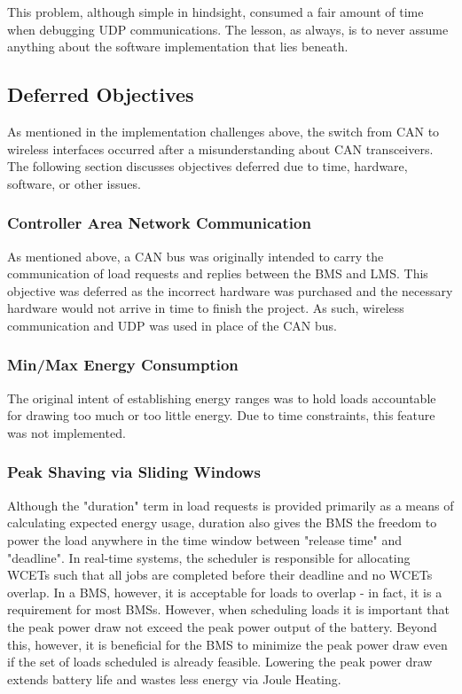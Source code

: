 \documentclass[11pt,conference,draftcls,onecolumn]{IEEEtran}
\begin{document}
This problem, although simple in hindsight, consumed a fair amount of time when debugging UDP communications.
The lesson, as always, is to never assume anything about the software implementation that lies beneath.

\subsection{Deferred Objectives}
As mentioned in the implementation challenges above, the switch from CAN to wireless interfaces occurred after a misunderstanding about CAN transceivers.
The following section discusses objectives deferred due to time, hardware, software, or other issues.

\subsubsection{Controller Area Network Communication}
As mentioned above, a CAN bus was originally intended to carry the communication of load requests and replies between the BMS and LMS.
This objective was deferred as the incorrect hardware was purchased and the necessary hardware would not arrive in time to finish the project.
As such, wireless communication and UDP was used in place of the CAN bus.

\subsubsection{Min/Max Energy Consumption}
The original intent of establishing energy ranges was to hold loads accountable for drawing too much or too little energy.
Due to time constraints, this feature was not implemented.

\subsubsection{Peak Shaving via Sliding Windows}
Although the "duration" term in load requests is provided primarily as a means of calculating expected energy usage, duration also gives the BMS the freedom to power the load anywhere in the time window between "release time" and "deadline".
In real-time systems, the scheduler is responsible for allocating WCETs such that all jobs are completed before their deadline and no WCETs overlap.
In a BMS, however, it is acceptable for loads to overlap - in fact, it is a requirement for most BMSs.
However, when scheduling loads it is important that the peak power draw not exceed the peak power output of the battery.
Beyond this, however, it is beneficial for the BMS to minimize the peak power draw even if the set of loads scheduled is already feasible.
Lowering the peak power draw extends battery life and wastes less energy via Joule Heating.
\end{document}
